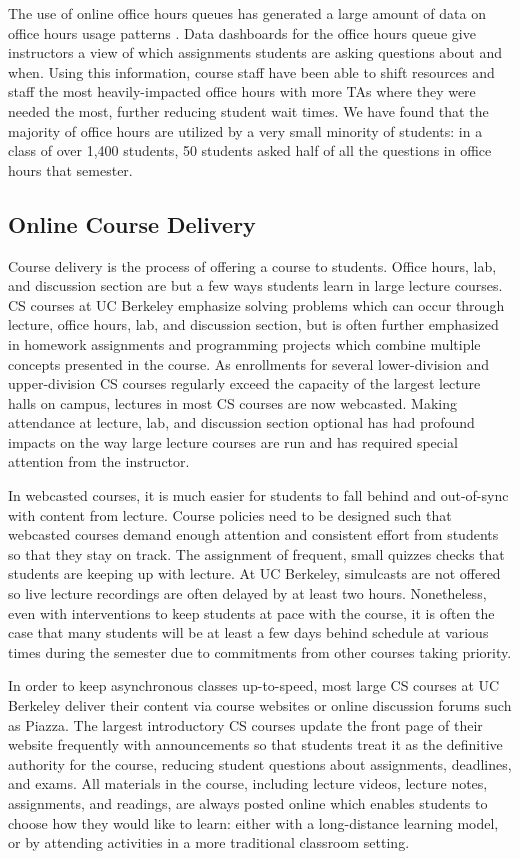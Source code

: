 The use of online office hours queues has generated a large amount of data on office hours usage patterns \cite{Smith:2017}. Data dashboards for the office hours queue give instructors a view of which assignments students are asking questions about and when. Using this information, course staff have been able to shift resources and staff the most heavily-impacted office hours with more TAs where they were needed the most, further reducing student wait times. We have found that the majority of office hours are utilized by a very small minority of students: in a class of over 1,400 students, 50 students asked half of all the questions in office hours that semester.

\subsection{Online Course Delivery}

Course delivery is the process of offering a course to students. Office hours, lab, and discussion section are but a few ways students learn in large lecture courses. CS courses at UC Berkeley emphasize solving problems which can occur through lecture, office hours, lab, and discussion section, but is often further emphasized in homework assignments and programming projects which combine multiple concepts presented in the course. As enrollments for several lower-division and upper-division CS courses regularly exceed the capacity of the largest lecture halls on campus, lectures in most CS courses are now webcasted. Making attendance at lecture, lab, and discussion section optional has had profound impacts on the way large lecture courses are run and has required special attention from the instructor.

In webcasted courses, it is much easier for students to fall behind and out-of-sync with content from lecture. Course policies need to be designed such that webcasted courses demand enough attention and consistent effort from students so that they stay on track. The assignment of frequent, small quizzes checks that students are keeping up with lecture. At UC Berkeley, simulcasts are not offered so live lecture recordings are often delayed by at least two hours. Nonetheless, even with interventions to keep students at pace with the course, it is often the case that many students will be at least a few days behind schedule at various times during the semester due to commitments from other courses taking priority.

In order to keep asynchronous classes up-to-speed, most large CS courses at UC Berkeley deliver their content via course websites or online discussion forums such as Piazza. The largest introductory CS courses update the front page of their website frequently with announcements so that students treat it as the definitive authority for the course, reducing student questions about assignments, deadlines, and exams. All materials in the course, including lecture videos, lecture notes, assignments, and readings, are always posted online which enables students to choose how they would like to learn: either with a long-distance learning model, or by attending activities in a more traditional classroom setting.


